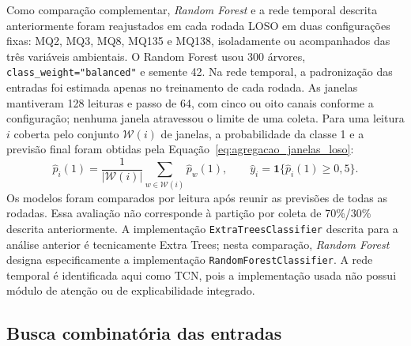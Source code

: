 Como comparação complementar, \textit{Random Forest} e a rede temporal
descrita anteriormente foram reajustados em cada rodada LOSO em duas
configurações fixas: MQ2, MQ3, MQ8, MQ135 e MQ138, isoladamente ou
acompanhados das três variáveis ambientais. O Random Forest usou 300
árvores, \texttt{class\_weight="balanced"} e semente 42. Na rede temporal,
a padronização das entradas foi estimada apenas no treinamento de cada
rodada. As janelas mantiveram 128 leituras e passo de 64, com cinco ou oito
canais conforme a configuração; nenhuma janela atravessou o limite de
uma coleta. Para uma leitura $i$ coberta pelo conjunto $\mathcal{W}(i)$
de janelas, a probabilidade da classe 1 e a previsão final foram obtidas
pela Equação~\eqref{eq:agregacao_janelas_loso}:
\begin{equation}
    \widehat p_i(1)=
    \frac{1}{|\mathcal{W}(i)|}
    \sum_{w\in\mathcal{W}(i)}\widehat p_w(1),
    \qquad
    \widehat y_i=\mathbf{1}\{\widehat p_i(1)\geq 0{,}5\}.
    \label{eq:agregacao_janelas_loso}
\end{equation}
Os modelos foram comparados por leitura após reunir as previsões de todas
as rodadas. Essa avaliação não corresponde à partição por coleta de 70\%/30\%
descrita anteriormente. A implementação \texttt{ExtraTreesClassifier}
descrita para a análise anterior é tecnicamente Extra Trees; nesta
comparação, \textit{Random Forest} designa especificamente a implementação
\texttt{RandomForestClassifier}. A rede temporal é identificada aqui como
TCN, pois a implementação usada não possui módulo de atenção ou de
explicabilidade integrado.

\subsection{Busca combinatória das entradas}
\label{subsec:busca_combinatoria_loso}

